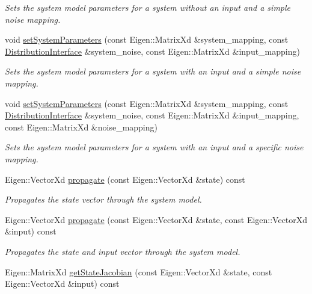 \begin{DoxyCompactItemize}
\begin{DoxyCompactList}\small\item\em Sets the system model parameters for a system without an input and a simple noise mapping. \end{DoxyCompactList}\item 
void \hyperlink{classrefill_1_1LinearSystemModel_a1bfe228bb42920399034c39ff59ae09d}{set\+System\+Parameters} (const Eigen\+::\+Matrix\+Xd \&system\+\_\+mapping, const \hyperlink{classrefill_1_1DistributionInterface}{Distribution\+Interface} \&system\+\_\+noise, const Eigen\+::\+Matrix\+Xd \&input\+\_\+mapping)
\begin{DoxyCompactList}\small\item\em Sets the system model parameters for a system with an input and a simple noise mapping. \end{DoxyCompactList}\item 
void \hyperlink{classrefill_1_1LinearSystemModel_aae2e0643e8091ccb36c14496a4e86334}{set\+System\+Parameters} (const Eigen\+::\+Matrix\+Xd \&system\+\_\+mapping, const \hyperlink{classrefill_1_1DistributionInterface}{Distribution\+Interface} \&system\+\_\+noise, const Eigen\+::\+Matrix\+Xd \&input\+\_\+mapping, const Eigen\+::\+Matrix\+Xd \&noise\+\_\+mapping)
\begin{DoxyCompactList}\small\item\em Sets the system model parameters for a system with an input and a specific noise mapping. \end{DoxyCompactList}\item 
Eigen\+::\+Vector\+Xd \hyperlink{classrefill_1_1LinearSystemModel_a6071f788057f7b1a4f382fbefd446369}{propagate} (const Eigen\+::\+Vector\+Xd \&state) const 
\begin{DoxyCompactList}\small\item\em Propagates the state vector through the system model. \end{DoxyCompactList}\item 
Eigen\+::\+Vector\+Xd \hyperlink{classrefill_1_1LinearSystemModel_a97553653a4daec3884637e1094d558ab}{propagate} (const Eigen\+::\+Vector\+Xd \&state, const Eigen\+::\+Vector\+Xd \&input) const 
\begin{DoxyCompactList}\small\item\em Propagates the state and input vector through the system model. \end{DoxyCompactList}\item 
Eigen\+::\+Matrix\+Xd \hyperlink{classrefill_1_1LinearSystemModel_a165b006f5758fd0a24cec545cbfa67b6}{get\+State\+Jacobian} (const Eigen\+::\+Vector\+Xd \&state, const Eigen\+::\+Vector\+Xd \&input) const 

\end{DoxyCompactItemize}
